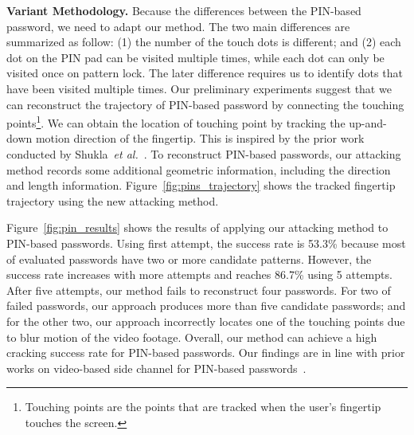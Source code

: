        \noindent \textbf{Variant Methodology.} Because the differences
        between the PIN-based password, we need to adapt our method. The two
        main differences are summarized as follow: (1) the number of the
        touch dots is different; and (2) each dot on the PIN pad can be
        visited multiple times, while each dot can only be visited once on
        pattern lock. The later difference requires us to identify dots that
        have been visited multiple times.  Our preliminary experiments
        suggest that we can reconstruct the trajectory of PIN-based password
        by connecting the touching points\footnote{Touching points are the
        points that are tracked when the user's fingertip touches the screen.}. We
        can obtain the location of touching point by tracking the up-and-down
        motion direction of the fingertip. This is inspired by the prior work
        conducted by Shukla~\emph{et al.}~\cite{shukla2014beware}. To reconstruct
        PIN-based passwords, our attacking method records some additional
        geometric information, including the direction and length
        information. Figure~\ref{fig:pins_trajectory} shows the tracked
        fingertip trajectory using the new attacking method.

        Figure~\ref{fig:pin_results} shows the
        results of applying our attacking method to PIN-based passwords.
        Using first attempt, the success rate is  53.3\% because most of
        evaluated passwords have two or more candidate patterns. However, the
        success rate increases with more attempts and reaches 86.7\% using 5
        attempts. After five attempts, our method fails to reconstruct four
        passwords. For two of failed passwords, our approach produces more
        than five candidate passwords; and for the other two, our approach
        incorrectly locates one of the touching points due to  blur
        motion of the video footage. Overall, our method can achieve a high
        cracking success rate for PIN-based passwords. Our findings are in
        line with prior works on video-based side channel for PIN-based
        passwords~\cite{shukla2014beware}.

%

